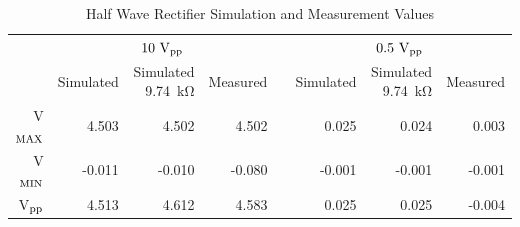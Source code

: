 \documentclass{../../ece-report}
\begin{document}
\begin{table}[h!]
  \centering
  \begin{tabular}{rrrrcrrr}\toprule
    & \multicolumn{3}{c}{$10~\si{\V}_\textnormal{pp}$} & & \multicolumn{3}{c}{$0.5~\si{\V}_\textnormal{pp}$} \\
    \cmidrule(lr){2-4} \cmidrule(lr){6-8}
    & Simulated & Simulated 9.74~\si{\kohm} & Measured & & Simulated & Simulated 9.74~\si{\kohm} & Measured \\
    V$_\textnormal{MAX}$ & 4.503  & 4.502  & 4.502  & & 0.025  & 0.024  &  0.003 \\
    V$_\textnormal{MIN}$ & -0.011 & -0.010 & -0.080 & & -0.001 & -0.001 & -0.001 \\
    V$_\textnormal{pp}$ &  4.513  & 4.612  & 4.583  & & 0.025  & 0.025  & -0.004 \\
    \bottomrule
  \end{tabular}
  \caption{Half Wave Rectifier Simulation and Measurement Values}
  \label{tab:half_wave}
\end{table}
\end{document}
